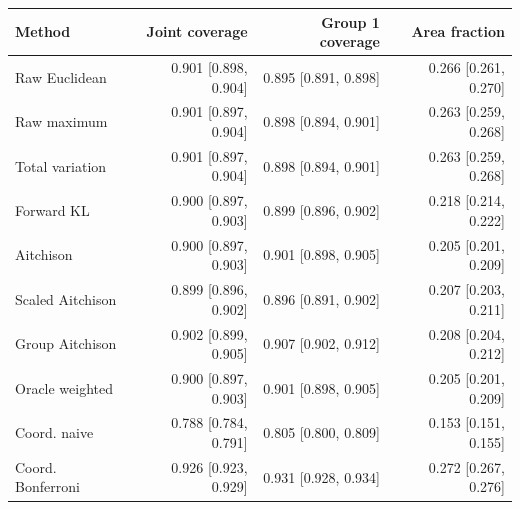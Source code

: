 \begin{tabular}{lrrr}
\toprule
Method & Joint coverage & Group 1 coverage & Area fraction \\
\midrule
Raw Euclidean & 0.901 [0.898, 0.904] & 0.895 [0.891, 0.898] & 0.266 [0.261, 0.270] \\
Raw maximum & 0.901 [0.897, 0.904] & 0.898 [0.894, 0.901] & 0.263 [0.259, 0.268] \\
Total variation & 0.901 [0.897, 0.904] & 0.898 [0.894, 0.901] & 0.263 [0.259, 0.268] \\
Forward KL & 0.900 [0.897, 0.903] & 0.899 [0.896, 0.902] & 0.218 [0.214, 0.222] \\
Aitchison & 0.900 [0.897, 0.903] & 0.901 [0.898, 0.905] & 0.205 [0.201, 0.209] \\
Scaled Aitchison & 0.899 [0.896, 0.902] & 0.896 [0.891, 0.902] & 0.207 [0.203, 0.211] \\
Group Aitchison & 0.902 [0.899, 0.905] & 0.907 [0.902, 0.912] & 0.208 [0.204, 0.212] \\
Oracle weighted & 0.900 [0.897, 0.903] & 0.901 [0.898, 0.905] & 0.205 [0.201, 0.209] \\
Coord. naive & 0.788 [0.784, 0.791] & 0.805 [0.800, 0.809] & 0.153 [0.151, 0.155] \\
Coord. Bonferroni & 0.926 [0.923, 0.929] & 0.931 [0.928, 0.934] & 0.272 [0.267, 0.276] \\
\bottomrule
\end{tabular}
